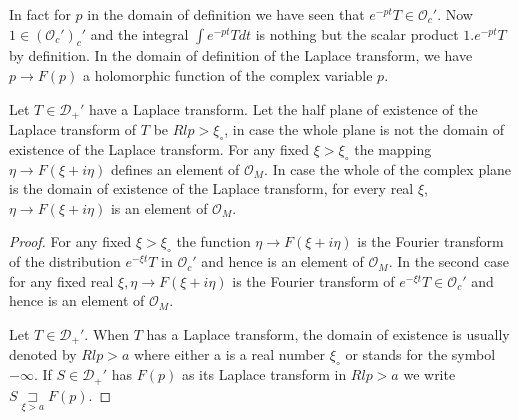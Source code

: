 In fact for $p$ in the domain of definition we have seen that $e^{-pt}
T \in \mathscr{O}_c'$. Now $1 \in (\mathscr{O}_c')_c'$ and the integral
$\int e^{-pt} T dt$ is nothing but the scalar product $1.e^{-pt}T$ by
definition. In the domain of definition of the Laplace transform, we
have $p \to F(p)$ a holomorphic function of the complex variable $p$.

\medskip

\begin{prop}\label{chap8:prop8.6}
Let $T \in \mathscr{D}_+'$ have a Laplace transform. Let the half
plane of existence of the Laplace transform of $T$ be $Rl p >
\xi_\circ$, in case the whole plane is not the domain of existence of
the Laplace transform. For any fixed $\xi > \xi_\circ$ the mapping
$\eta \to F(\xi + i\eta)$ defines an element of $\mathscr{O}_M$. In
case the whole of the complex plane is the domain of existence of the
Laplace transform, for every real $\xi$, $\eta \to F(\xi + i\eta)$ is
an element of $\mathscr{O}_M$.
\end{prop}

\begin{proof}
For any fixed $\xi > \xi_\circ$ the function $\eta \to F(\xi + i\eta)$
is the Fourier transform of the distribution $e^{-\xi t}T$ in
$\mathscr{O}_c'$ and hence is an element of $\mathscr{O}_M$. In the
second case for any fixed real $\xi, \eta \to F(\xi + i\eta)$ is the
Fourier transform of $e^{-\xi t} T \in \mathscr{O}_c'$ and hence is an
element of $\mathscr{O}_M$.

Let $T\in \mathscr{D}_+'$. When $T$ has a Laplace transform, the
domain of existence is usually denoted by $Rl p > a$ where either a is
a real number $\xi_\circ$ or stands for the symbol $- \infty$. If $S
\in \mathscr{D}_+'$ has $F(p)$ as its Laplace transform in $Rl p > a$
we write $S \underset{\xi > a}{\sqsupset} F(p)$.
\end{proof}

